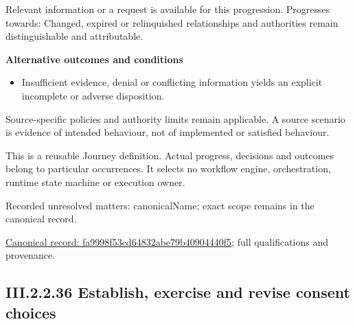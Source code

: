 Relevant information or a request is available for this progression. Progresses towards: Changed, expired or relinquished relationships and authorities remain distinguishable and attributable.



\par\medskip\textbf{Alternative outcomes and conditions}\par


\begin{itemize}


\item Insufficient evidence, denial or conflicting information yields an explicit incomplete or adverse disposition.

\end{itemize}


Source-specific policies and authority limits remain applicable. A source scenario is evidence of intended behaviour, not of implemented or satisfied behaviour.



This is a reusable Journey definition. Actual progress, decisions and outcomes belong to particular occurrences. It selects no workflow engine, orchestration, runtime state machine or execution owner.


{\small Recorded unresolved matters: canonicalName; exact scope remains in the canonical record.}\par
{\footnotesize \href{../../../../continuum/strategy/value-stream/fa9998f53cd64832abe79b40904440f5.md}{Canonical record: fa9998f53cd64832abe79b40904440f5}; full qualifications and provenance.}\par
\subsection*{III.2.2.36 Establish, exercise and revise consent choices}
\label{navigation:III.2.2.36}

